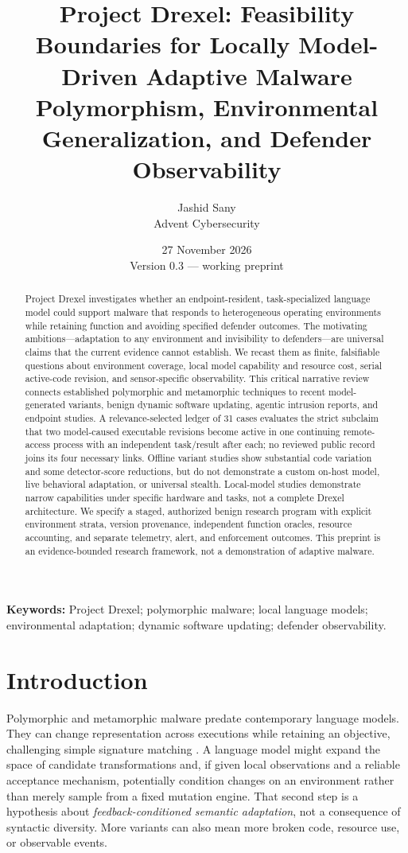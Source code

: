 \documentclass[11pt,letterpaper]{article}
\title{Project Drexel: Feasibility Boundaries for Locally Model-Driven Adaptive Malware\\
\large Polymorphism, Environmental Generalization, and Defender Observability}
\author{Jashid Sany\\\small Advent Cybersecurity}
\date{27 November 2026\\Version 0.3 --- working preprint}
\begin{document}
\maketitle

\begin{abstract}
Project Drexel investigates whether an endpoint-resident, task-specialized language model could support malware that responds to heterogeneous operating environments while retaining function and avoiding specified defender outcomes. The motivating ambitions---adaptation to any environment and invisibility to defenders---are universal claims that the current evidence cannot establish. We recast them as finite, falsifiable questions about environment coverage, local model capability and resource cost, serial active-code revision, and sensor-specific observability. This critical narrative review connects established polymorphic and metamorphic techniques to recent model-generated variants, benign dynamic software updating, agentic intrusion reports, and endpoint studies. A relevance-selected ledger of 31 cases evaluates the strict subclaim that two model-caused executable revisions become active in one continuing remote-access process with an independent task/result after each; no reviewed public record joins its four necessary links. Offline variant studies show substantial code variation and some detector-score reductions, but do not demonstrate a custom on-host model, live behavioral adaptation, or universal stealth. Local-model studies demonstrate narrow capabilities under specific hardware and tasks, not a complete Drexel architecture. We specify a staged, authorized benign research program with explicit environment strata, version provenance, independent function oracles, resource accounting, and separate telemetry, alert, and enforcement outcomes. This preprint is an evidence-bounded research framework, not a demonstration of adaptive malware.
\end{abstract}

\noindent\textbf{Keywords:} Project Drexel; polymorphic malware; local language models; environmental adaptation; dynamic software updating; defender observability.

\section{Introduction}

Polymorphic and metamorphic malware predate contemporary language models. They can change representation across executions while retaining an objective, challenging simple signature matching \cite{mitrepoly,waveatlas}. A language model might expand the space of candidate transformations and, if given local observations and a reliable acceptance mechanism, potentially condition changes on an environment rather than merely sample from a fixed mutation engine. That second step is a hypothesis about \emph{feedback-conditioned semantic adaptation}, not a consequence of syntactic diversity. More variants can also mean more broken code, resource use, or observable events.
\end{document}
